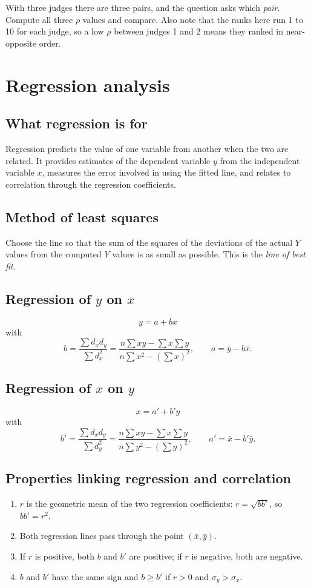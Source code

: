 \documentclass[11pt,a4paper]{article}
\begin{document}
\begin{dangerbox}
With three judges there are three pairs, and the question asks which \emph{pair}. Compute all three $\rho$ values and compare. Also note that the ranks here run 1 to 10 for each judge, so a low $\rho$ between judges 1 and 2 means they ranked in near-opposite order.
\end{dangerbox}

\section{Regression analysis}

\subsection{What regression is for}
Regression predicts the value of one variable from another when the two are related. It provides estimates of the dependent variable $y$ from the independent variable $x$, measures the error involved in using the fitted line, and relates to correlation through the regression coefficients.

\subsection{Method of least squares}
Choose the line so that the sum of the squares of the deviations of the actual $Y$ values from the computed $Y$ values is as small as possible. This is the \emph{line of best fit}.

\subsection{Regression of $y$ on $x$}
\[
\boxed{y=a+bx}
\]
with
\[
b=\frac{\sum d_xd_y}{\sum d_x^2}=\frac{n\sum xy-\sum x\sum y}{n\sum x^2-(\sum x)^2},\qquad a=\bar y-b\bar x.
\]

\subsection{Regression of $x$ on $y$}
\[
\boxed{x=a'+b'y}
\]
with
\[
b'=\frac{\sum d_xd_y}{\sum d_y^2}=\frac{n\sum xy-\sum x\sum y}{n\sum y^2-(\sum y)^2},\qquad a'=\bar x-b'\bar y.
\]

\subsection{Properties linking regression and correlation}
\begin{enumerate}
\item $r$ is the geometric mean of the two regression coefficients: $r=\sqrt{bb'}$, so $bb'=r^2$.
\item Both regression lines pass through the point $(\bar x,\bar y)$.
\item If $r$ is positive, both $b$ and $b'$ are positive; if $r$ is negative, both are negative.
\item $b$ and $b'$ have the same sign and $b\ge b'$ if $r>0$ and $\sigma_y>\sigma_x$.
\end{enumerate}
\end{document}
